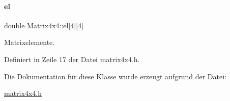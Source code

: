 \paragraph{\texorpdfstring{el}{el}}
{\footnotesize\ttfamily double Matrix4x4\+::el\mbox{[}4\mbox{]}\mbox{[}4\mbox{]}}



Matrixelemente. 



Definiert in Zeile 17 der Datei matrix4x4.\+h.



Die Dokumentation für diese Klasse wurde erzeugt aufgrund der Datei\+:\begin{DoxyCompactItemize}
\item 
\mbox{\hyperlink{matrix4x4_8h}{matrix4x4.\+h}}\end{DoxyCompactItemize}
